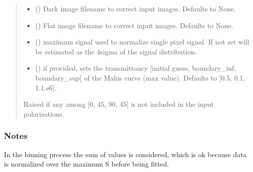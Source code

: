 \documentclass[letterpaper,10pt,english]{sphinxmanual}
\begin{document}
\begin{fulllineitems}
\begin{quote}
\begin{description}
\begin{itemize}
\item {} 
\sphinxAtStartPar
{} (\sphinxstyleliteralemphasis{\sphinxupquote{, }}) \textendash{} Dark image filename to correct input images. Defaults to None.

\item {} 
\sphinxAtStartPar
{} (\sphinxstyleliteralemphasis{\sphinxupquote{, }}) \textendash{} Flat image filename to correct input images. Defaults to None.

\item {} 
\sphinxAtStartPar
{} (\sphinxstyleliteralemphasis{\sphinxupquote{, }}) \textendash{} maximum signal used to normalize single pixel signal. If not set will be estimated as the 4sigma of the signal distribution.

\item {} 
\sphinxAtStartPar
{} () \textendash{} if provided, sets the transmittancy {[}initial guess, boundary\_inf, boundary\_sup{]} of the Malus curve (max value). Defaults to {[}0.5, 0.1, 1.\sphinxhyphen{}1.e\sphinxhyphen{}6{]}.

\end{itemize}

\sphinxAtStartPar
{} \textendash{} Raised if any among {[}0, 45, 90, \sphinxhyphen{}45{]} is not included in the input polarizations.

\end{description}\end{quote}
\subsubsection*{Notes}

\sphinxAtStartPar
In the binning process the sum of values is considered, which is ok because data is normalized over the maximum S before being fitted.

\end{fulllineitems}
\end{document}
